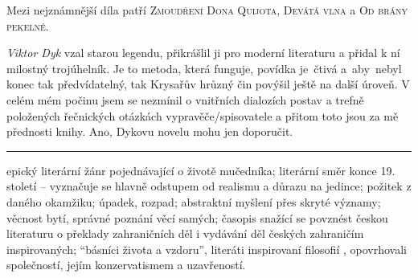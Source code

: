 \documentclass[FGBook.tex]{subfiles}
\begin{document}

\noindent 
Mezi nejznámnější díla patří \textsc{Zmoudření Dona Quijota}, \textsc{Devátá vlna} a \textsc{Od brány pekelné}.





\vspace*{2em}
\noindent 
\textit{Viktor Dyk} vzal starou legendu, přikrášlil ji pro moderní literaturu a přidal k ní milostný trojúhelník.
Je to metoda, která funguje, povídka je~čtivá a~aby~nebyl konec tak předvídatelný, tak Krysařův hrůzný čin povýšil ještě na další úroveň.
V celém mém počinu jsem se nezmínil o vnitřních dialozích postav a trefně položených řečnických otázkách vypravěče/spisovatele a přitom toto jsou za mě přednosti knihy.
Ano, Dykovu novelu mohu jen doporučit.

\vfill

\noindent\begin{minipage}{\textwidth}
    {\textcolor{\wpagecolor}{\rule{\linewidth}{0.4pt}}
    \footnotesize
     epický literární žánr pojednávající o životě mučedníka;
     literární směr konce 19. století -- vyznačuje se hlavně odstupem od realismu a důrazu na jedince;
     požitek z daného okamžiku;
     úpadek, rozpad;
     abstraktní myšlení přes skryté významy;
     věcnost bytí, správné poznání věcí samých;
     časopis snažící se povznést českou literaturu o překlady zahraničních děl i vydávání děl českých zahraničím inspirovaných;
     \enquote{básníci života a vzdoru}, literáti inspirovaní filosofií , opovrhovali společností, jejím konzervatismem a uzavřeností.
    }
\end{minipage}

\newpage
\end{document}
